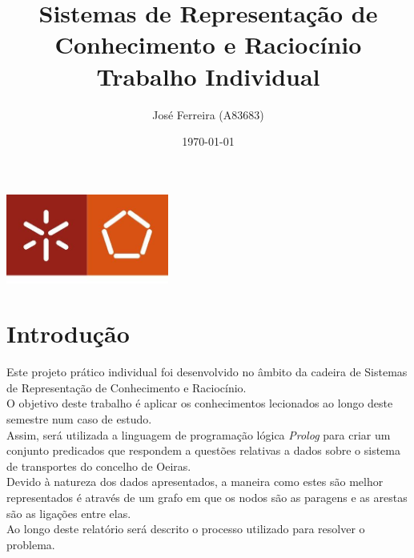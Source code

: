 \documentclass[a4paper]{report}
\begin{document}
\title{Sistemas de Representação de Conhecimento e Raciocínio\\
\large Trabalho Individual}
\author{José Ferreira (A83683)}
\date{\today}

\begin{center}
    \begin{minipage}{0.75\linewidth}
        \centering
        \includegraphics[width=0.4\textwidth]{images/eng.jpeg}\par\vspace{1cm}
        \vspace{1.5cm}
        \href{https://www.uminho.pt/PT}
        {\color{black}{\scshape\LARGE Universidade do Minho}} \par
        \vspace{1cm}
        \href{https://www.di.uminho.pt/}
        {\color{black}{\scshape\Large Departamento de Informática}} \par
        \vspace{1.5cm}
        \maketitle
    \end{minipage}
\end{center}

\tableofcontents

\chapter{Introdução}
Este projeto prático individual foi desenvolvido no âmbito da cadeira de
Sistemas de Representação de Conhecimento e Raciocínio.\\
O objetivo deste trabalho é aplicar os conhecimentos lecionados ao longo deste
semestre num caso de estudo.\\
Assim, será utilizada a linguagem de programação lógica \textit{Prolog} para
criar um conjunto predicados que respondem a questões relativas a dados sobre o
sistema de transportes do concelho de Oeiras.\\
Devido à natureza dos dados apresentados, a maneira como estes são melhor
representados é através de um grafo em que os nodos são as paragens e as arestas
são as ligações entre elas.\\
Ao longo deste relatório será descrito o processo utilizado para resolver o
problema.\\
\end{document}
